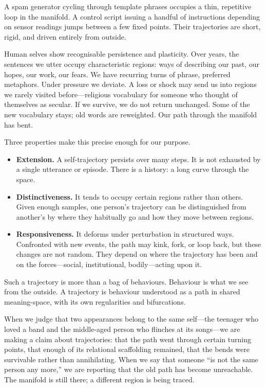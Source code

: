 \documentclass[12pt,a4paper]{article}
\begin{document}
A spam generator cycling through template phrases occupies a thin, repetitive loop in the manifold. A control script issuing a handful of instructions depending on sensor readings jumps between a few fixed points. Their trajectories are short, rigid, and driven entirely from outside.

Human selves show recognisable persistence and plasticity. Over years, the sentences we utter occupy characteristic regions: ways of describing our past, our hopes, our work, our fears. We have recurring turns of phrase, preferred metaphors. Under pressure we deviate. A loss or shock may send us into regions we rarely visited before---religious vocabulary for someone who thought of themselves as secular. If we survive, we do not return unchanged. Some of the new vocabulary stays; old words are reweighted. Our path through the manifold has bent.

Three properties make this precise enough for our purpose.

\begin{itemize}
\item \textbf{Extension.} A self-trajectory persists over many steps. It is not exhausted by a single utterance or episode. There is a history: a long curve through the space.
\item \textbf{Distinctiveness.} It tends to occupy certain regions rather than others. Given enough samples, one person's trajectory can be distinguished from another's by where they habitually go and how they move between regions.
\item \textbf{Responsiveness.} It deforms under perturbation in structured ways. Confronted with new events, the path may kink, fork, or loop back, but these changes are not random. They depend on where the trajectory has been and on the forces---social, institutional, bodily---acting upon it.
\end{itemize}

Such a trajectory is more than a bag of behaviours. Behaviour is what we see from the outside. A trajectory is behaviour understood as a path in shared meaning-space, with its own regularities and bifurcations.

When we judge that two appearances belong to the same self---the teenager who loved a band and the middle-aged person who flinches at its songs---we are making a claim about trajectories: that the path went through certain turning points, that enough of its relational scaffolding remained, that the bends were survivable rather than annihilating. When we say that someone ``is not the same person any more,'' we are reporting that the old path has become unreachable. The manifold is still there; a different region is being traced.
\end{document}
